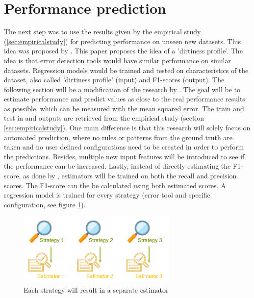 \section{Performance prediction}
\label{sec:performanceprediction}
The next step was to use the results given by the empirical study (\ref{sec:empiricalstudy}) for predicting performance on unseen new datasets. This idea was proposed by \cite{Mahdavi2019-pk}. This paper proposes the idea of a 'dirtiness profile'. The idea is that error detection tools would have similar performance on similar datasets. Regression models would be trained and tested on characteristics of the dataset, also called 'dirtiness profile' (input) and F1-scores (output). The following section will be a modification of the research by \cite{Mahdavi2019-pk}. 
The goal will be to estimate performance and predict values as close to the real performance results as possible, which can be measured with the mean squared error.
The train and test in and outputs are retrieved from the empirical study (section \ref{sec:empiricalstudy}). One main difference is that this research will solely focus on automated prediction, where no rules or patterns from the ground truth are taken and no user defined configurations need to be created in order to perform the predictions. Besides, multiple new input features will be introduced to see if the performance can be increased. Lastly, instead of directly estimating the F1-score, as done by \cite{Mahdavi2019-pk}, estimators will be trained on both the recall and precision scores. The F1-score can the be calculated using both estimated scores.
A regression model is trained for every strategy (error tool and specific configuration, see figure \ref{fig:eachstrategy}). 

\begin{figure}
	\centering
	\includegraphics[width=0.7\textwidth]{thesis/Figures/EachStrategy.png}
	\caption{Each strategy will result in a separate estimator}
	\label{fig:eachstrategy}
\end{figure}

